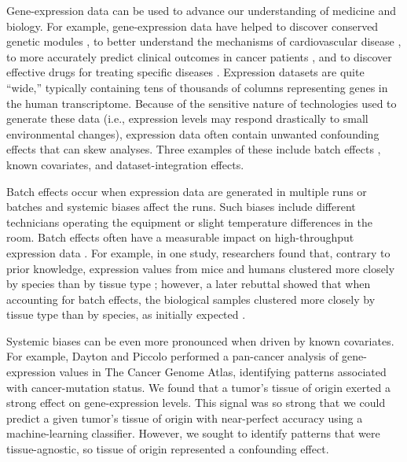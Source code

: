 \documentclass[11pt]{article}
\begin{document}
Gene-expression data can be used to advance our understanding of medicine and biology.
For example, gene-expression data have helped to discover conserved genetic modules \citep{stuart_gene-coexpression_2003}, to better understand the mechanisms of cardiovascular disease \citep{henriksen_application_2002}, to more accurately predict clinical outcomes in cancer patients \citep{veer_gene_2002}, and to discover effective drugs for treating specific diseases \citep{sirota_discovery_2011}.
Expression datasets are quite ``wide,'' typically containing tens of thousands of columns representing genes in the human transcriptome.
Because of the sensitive nature of technologies used to generate these data (i.e., expression levels may respond drastically to small environmental changes), expression data often contain unwanted confounding effects that can skew analyses. %
Three examples of these include batch effects \label{it:batch}, known covariates, and dataset-integration effects. %

Batch effects occur when expression data are generated in multiple runs or batches and systemic biases affect the runs. Such biases include different technicians operating the equipment or slight temperature differences in the room.
Batch effects often have a measurable impact on high-throughput expression data \citep{leek_tackling_2010}.
For example, in one study, researchers found that, contrary to prior knowledge, expression values from mice and humans clustered more closely by species than by tissue type \citep{yue_comparative_2014};
however, a later rebuttal showed that when accounting for batch effects, the biological samples clustered more closely by tissue type than by species, as initially expected \citep{gilad_reanalysis_2015}.

Systemic biases can be even more pronounced when driven by known covariates.
For example, Dayton and Piccolo performed a pan-cancer analysis of gene-expression values in The Cancer Genome Atlas, identifying patterns associated with cancer-mutation status\citep{dayton_classifying_2017-1}.
We found that a tumor's tissue of origin exerted a strong effect on gene-expression levels.
This signal was so strong that we could predict a given tumor's tissue of origin with near-perfect accuracy using a machine-learning classifier.
However, we sought to identify patterns that were tissue-agnostic, so tissue of origin represented a confounding effect.
\end{document}
